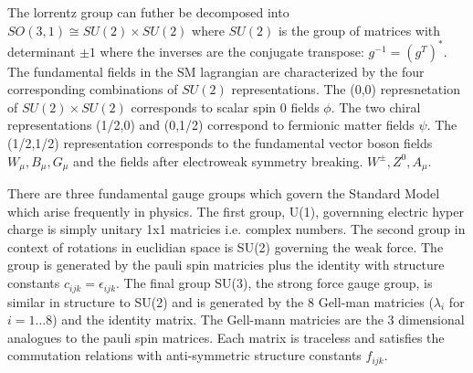 The lorrentz group can futher be decomposed into  $SO(3,1) \cong SU(2) \times SU(2)$
where $SU(2)$ is the group of matrices with determinant $\pm 1$ where the inverses are
 the conjugate transpose: $g^{-1} = (g^{T})^*$. The fundamental fields in the SM
lagrangian are characterized by the four corresponding combinations of $SU(2)$ representations. The (0,0) represnetation 
of $SU(2) \times SU(2)$ corresponds to scalar spin 0 fields $\phi$. The two chiral representations (1/2,0) and (0,1/2) correspond to fermionic matter fields $\psi$. The (1/2,1/2) representation corresponds to the fundamental 
vector boson fields $W_\mu, B_\mu, G_\mu$ and the fields after electroweak symmetry breaking. $W^{\pm}, Z^0, A_\mu$. 

There are three fundamental gauge groups which govern the Standard Model which arise frequently in physics.
The first group, U(1), governning electric hyper charge is simply unitary 1x1 matricies i.e. complex numbers. The
second group in context of rotations in euclidian space is SU(2) governing the weak force. The group is generated
by the pauli spin matricies plus the identity with structure constants $c_{ijk} = \epsilon_{ijk}$. 
The final group SU(3), the strong force gauge group, is similar in structure to SU(2) and is generated
 by the 8 Gell-man matricies ($\lambda_i$ for $i=1\ldots 8$) and the identity matrix.  The Gell-mann matricies
are the 3 dimensional analogues to the pauli spin matrices. Each matrix is traceless and satisfies the  
commutation relations with anti-symmetric structure constants $f_{ijk}$. 

